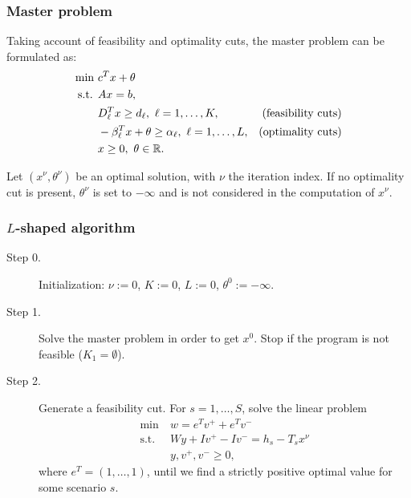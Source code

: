 \documentclass{beamer}
\begin{document}
\begin{frame}
\frametitle{Master problem}

Taking account of feasibility and optimality cuts, the master problem can be formulated as:
\begin{align*}
\min\ & c^Tx + \theta \\
\mbox{s.t. } & Ax = b, \\
& D_{\ell}^Tx \geq d_{\ell},\ \ell = 1,\ldots,K, & \mbox{(feasibility cuts)} \\
& -\beta_{\ell}^Tx + \theta \geq \alpha_{\ell},\ \ell = 1,\ldots,L, & \mbox{(optimality cuts)}\\
& x \geq 0,\ \theta \in {\mathbb{R}}.
\end{align*}
	
\mbox{}

Let $(x^{\nu}, \theta^{\nu})$ be an optimal solution, with $\nu$ the iteration index.
If no optimality cut is present, $\theta^{\nu}$ is set to $-\infty$ and is not considered in the computation of $x^{\nu}$.

\end{frame}

\begin{frame}
\frametitle{$L$-shaped algorithm}
	
\begin{description}
\item[Step 0.]  {\red Initialization}:
$\nu := 0$, $K := 0$, $L:= 0$, $\theta^{0} := -\infty$.
\item[Step 1.] {\red Solve the master problem} in order to get $x^0$.
Stop if the program is not feasible ($K_1 = \emptyset$).
\item[Step 2.]
Generate a {\red feasibility cut}.
For $s = 1,\ldots,S$, solve the linear problem
\begin{align*}
\min\ & w = e^Tv^+ + e^Tv^- \\
\mbox{s.t. } & Wy + Iv^+ - Iv^- = h_s - T_sx^{\nu} \\
& y, v^+, v^- \geq 0,
\end{align*}
where $e^T = (1,\ldots,1)$, until we find a strictly positive optimal value for some scenario $s$.
\end{description}
	
\end{frame}
\end{document}
